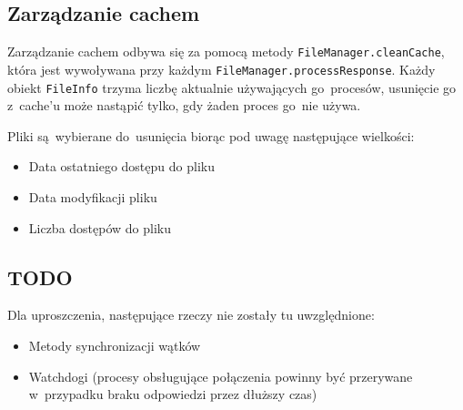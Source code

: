 \documentclass[a4paper,notitlepage]{article}
\begin{document}
\subsection{Zarządzanie cachem}
Zarządzanie cachem odbywa się za pomocą metody \texttt{FileManager.cleanCache},
która jest wywoływana przy każdym \texttt{FileManager.processResponse}.
Każdy obiekt \texttt{FileInfo} trzyma liczbę aktualnie używających go~procesów,
usunięcie go z~cache'u może nastąpić tylko, gdy żaden proces go~nie używa.

Pliki są~wybierane do~usunięcia biorąc pod uwagę następujące wielkości:
\begin{itemize}
\item Data ostatniego dostępu do pliku
\item Data modyfikacji pliku
\item Liczba dostępów do pliku
\end{itemize}

\subsection{TODO}
Dla uproszczenia, następujące rzeczy nie zostały tu uwzględnione:
\begin{itemize}
\item Metody synchronizacji wątków
\item Watchdogi (procesy obsługujące połączenia powinny być przerywane
w~przypadku braku odpowiedzi przez dłuższy czas)
\end{itemize}
\end{document}
